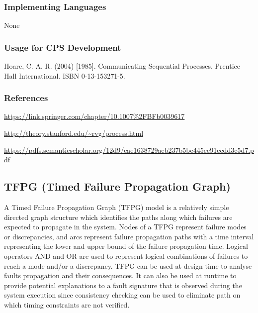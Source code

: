 \subsubsection{Implementing Languages}

None

\subsubsection{Usage for CPS Development}
Hoare, C. A. R. (2004) [1985]. Communicating Sequential Processes. Prentice Hall International. ISBN 0-13-153271-5.

\cite{A2011}
\cite{AM2009}
\cite{BKGS2010}


\subsubsection{References}

\url{https://link.springer.com/chapter/10.1007%2FBFb0039617}
	
\url{http://theory.stanford.edu/~rvg/process.html}
	
\url{https://pdfs.semanticscholar.org/12d9/eae1638729aeb237b5be445ee91ecdd3c5d7.pdf}


\subsection{TFPG (Timed Failure Propagation Graph)}
\label{subsecF:TFPG}

A Timed Failure Propagation Graph (TFPG) model is a relatively simple directed graph structure which identifies the paths along which failures are expected to propagate in the system. Nodes of a TFPG represent failure modes or discrepancies, and arcs represent failure propagation paths with a time interval representing the lower and upper bound of the failure propagation time. Logical operators AND and OR are used to represent logical combinations of failures to reach a mode and/or a discrepancy. TFPG can be used at design time to analyse faults propagation and their consequences. It can also be used at runtime to provide potential explanations to a fault signature that is observed during the system execution since consistency checking can be used to eliminate path on which timing constraints are not verified.

